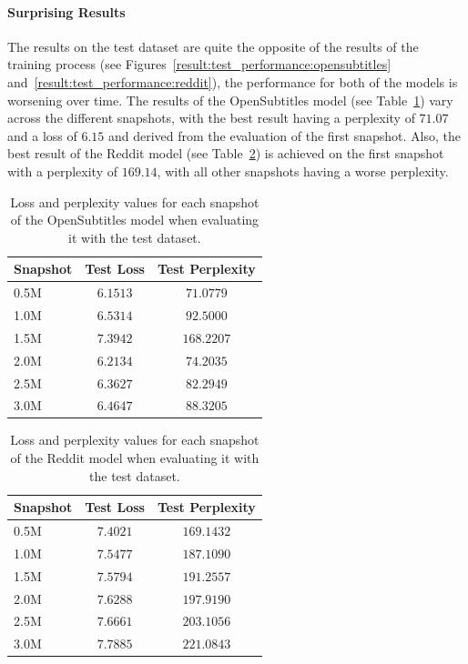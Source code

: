 \paragraph{Surprising Results} The results on the test dataset are quite the opposite of the results of the training process (see Figures~\ref{result:test_performance:opensubtitles} and~\ref{result:test_performance:reddit}), the performance for both of the models is
worsening over time. The results of the OpenSubtitles model (see Table~\ref{results:test_metrics:opensubtitles}) vary across the different snapshots, with the best result having a perplexity of $71.07$ and a loss of $6.15$ and derived from the evaluation of the first snapshot. Also, the best result of the Reddit model (see Table~\ref{results:test_metrics:reddit}) is achieved on the first snapshot with a perplexity of $169.14$, with all other snapshots having a worse perplexity.
\\
\begin{table}[H]
	\centering
	\begin{adjustbox}{max width=\textwidth}
		\begin{tabular}{l|cc}
			\toprule
			Snapshot & Test Loss & Test Perplexity\\
			\midrule
			0.5M & $6.1513$ & $71.0779$\\
			1.0M & $6.5314$ & $92.5000$\\
			1.5M & $7.3942$ & $168.2207$\\
			2.0M & $6.2134$ & $74.2035$\\
			2.5M & $6.3627$ & $82.2949$\\
			3.0M & $6.4647$ & $88.3205$\\
			\bottomrule
		\end{tabular}
	\end{adjustbox}
	\caption{Loss and perplexity values for each snapshot of the OpenSubtitles model when evaluating it with the test dataset.}
	\label{results:test_metrics:opensubtitles}
\end{table}

\begin{table}[H]
	\centering
	\begin{adjustbox}{max width=\textwidth}
		\begin{tabular}{l|cc}
			\toprule
			Snapshot & Test Loss & Test Perplexity\\
			\midrule
			0.5M & $7.4021$ & $169.1432$\\
			1.0M & $7.5477$ & $187.1090$\\
			1.5M & $7.5794$ & $191.2557$\\
			2.0M & $7.6288$ & $197.9190$\\
			2.5M & $7.6661$ & $203.1056$\\
			3.0M & $7.7885$ & $221.0843$\\
			\bottomrule
		\end{tabular}
	\end{adjustbox}
	\caption{Loss and perplexity values for each snapshot of the Reddit model when evaluating it with the test dataset.}
	\label{results:test_metrics:reddit}
\end{table}

